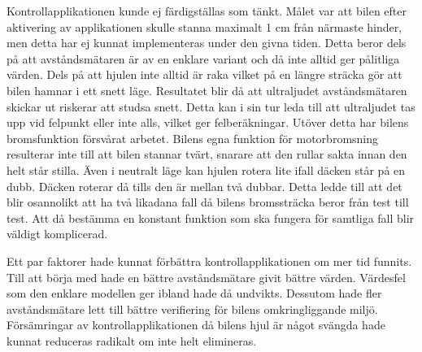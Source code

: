 \documentclass[a4paper]{article}
\begin{document}
\vspace{5mm} \noindent
Kontrollapplikationen kunde ej färdigställas som tänkt. Målet var att bilen efter aktivering av applikationen skulle stanna maximalt 1 cm från närmaste hinder, men detta har ej kunnat implementeras under den givna tiden. Detta beror dels på att avståndsmätaren är av en enklare variant och då inte alltid ger pålitliga värden. Dels på att hjulen inte alltid är raka vilket på en längre sträcka gör att bilen hamnar i ett snett läge. Resultatet blir då att ultraljudet avståndsmätaren skickar ut riskerar att studsa snett. Detta kan i sin tur leda till att ultraljudet tas upp vid felpunkt eller inte alls, vilket ger felberäkningar. Utöver detta har bilens bromsfunktion försvårat arbetet. Bilens egna funktion för motorbromsning resulterar inte till att bilen stannar tvärt, snarare att den rullar sakta innan den helt står stilla. Även i neutralt läge kan hjulen rotera lite ifall däcken står på en dubb. Däcken roterar då tills den är mellan två dubbar. Detta ledde till att det blir osannolikt att ha två likadana fall då bilens bromssträcka beror från test till test. Att då bestämma en konstant funktion som ska fungera för samtliga fall blir väldigt komplicerad. 


\vspace{5mm} \noindent
Ett par faktorer hade kunnat förbättra kontrollapplikationen om mer tid funnits. Till att börja med hade en bättre avståndsmätare givit bättre värden. Värdesfel som den enklare modellen ger ibland hade då undvikts. Dessutom hade fler avståndsmätare lett till bättre verifiering för bilens omkringliggande miljö. Försämringar av kontrollapplikationen då bilens hjul är något svängda hade kunnat reduceras radikalt om inte helt elimineras.


\end{document}
